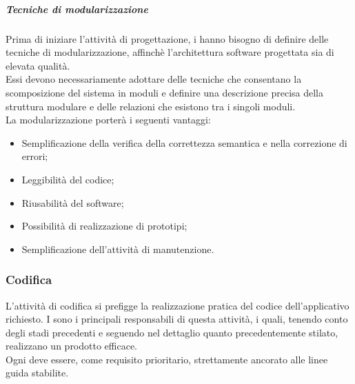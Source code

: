 	\subparagraph{Tecniche di modularizzazione}
	Prima di iniziare l'attività di progettazione, i \textit{\Progs} hanno bisogno di definire delle tecniche di modularizzazione, affinchè l'architettura software progettata sia di elevata qualità.\\
	Essi devono necessariamente adottare delle tecniche che consentano la scomposizione del sistema in moduli e definire una descrizione precisa della struttura modulare e delle relazioni che esistono tra i singoli moduli.\\
	La modularizzazione porterà i seguenti vantaggi:
	\begin{itemize}
		\item Semplificazione della verifica della correttezza semantica e nella correzione di errori;
		\item Leggibilità del codice;
		\item Riusabilità del software;
		\item Possibilità di realizzazione di prototipi;
		\item Semplificazione dell'attività di manutenzione.
	\end{itemize}
	
	\subsubsection{Codifica}
	L'attività di codifica si prefigge la realizzazione pratica del codice dell'applicativo richiesto. I \textit{\Progrs} sono i principali responsabili di questa attività, i quali, tenendo conto degli stadi precedenti e seguendo nel dettaglio quanto precedentemente stilato, realizzano un prodotto efficace.\\
	Ogni \textit{\Progr} deve essere, come requisito prioritario, strettamente ancorato alle linee guida stabilite.
	
